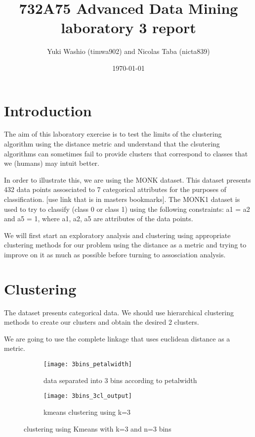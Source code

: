 \documentclass[letterpaper,12pt]{article}
\begin{document}
\title{732A75 Advanced Data Mining laboratory 3 report}
\author{Yuki Washio (timwa902) and Nicolas Taba (nicta839)}
\date{\today}
\maketitle



\section{Introduction}

The aim of this laboratory exercise is to test the limits of the clustering algorithm using the distance metric and understand that the clsutering algorithms can sometimes fail to provide clusters that correspond to classes that we (humans) may intuit better.

In order to illustrate this, we are using the MONK dataset.
This dataset presents 432 data points assosciated to 7 categorical attributes for the purposes of classification. [use link that is in masters bookmarks]. The MONK1 dataset is used to try to classify (class 0 or class 1) using the following constraints: a1 = a2 and a5 = 1, where a1, a2, a5 are attributes of the data points.

We will first start an exploratory analysis and clustering using appropriate clustering methods for our problem using the distance as a metric and trying to improve on it as much as possible before turning to assosciation analysis.


\section{Clustering}

The dataset presents categorical data. We should use hierarchical clustering methods to create our clusters and obtain the desired 2 clusters.

We are going to use the complete linkage that uses euclidean distance as a metric.

\begin{figure}[H]
\begin{subfigure}{.5\textwidth}
  \centering
  \texttt{[image: 3bins\_petalwidth]}  
  \caption{data separated into 3 bins according to petalwidth}
  \label{fig:sub-first_1}
\end{subfigure}
\begin{subfigure}{.5\textwidth}
  \centering
  \texttt{[image: 3bins\_3cl\_output]}  
  \caption{kmeans clustering using k=3}
  \label{fig:sub-second_1}
\end{subfigure}
\caption{clustering using Kmeans with k=3 and n=3 bins}
\label{fig:fig_1}
\end{figure}
\end{document}
